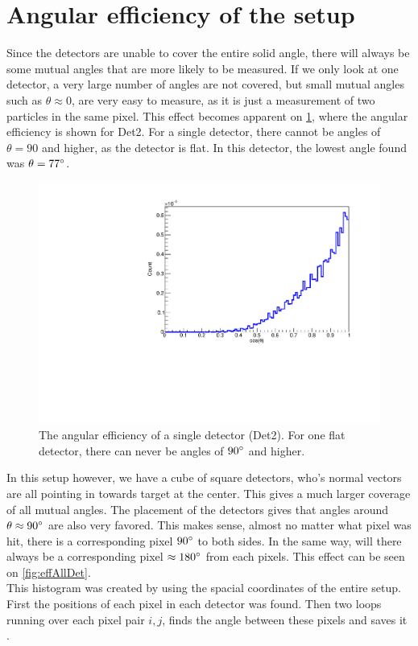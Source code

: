 \section{Angular efficiency of the setup}
Since the detectors are unable to cover the entire solid angle, there will always be some mutual angles that are more likely to be measured. 
If we only look at one detector, a very large number of angles are not covered, but small mutual angles such as $\theta \approx 0$, are very easy to measure, as it is just a measurement of two particles in the same pixel. 
This effect becomes apparent on \cref{fig:oneDetEff}, where the angular efficiency is shown for Det2. For a single detector, there cannot be angles of $\theta = 90$ and higher, as the detector is flat. In this detector, the lowest angle found was $\theta = 77\degree$.\\

\begin{figure}[h]
	\includegraphics[width=\linewidth]{../figures/det2Eff.pdf}
	\caption{The angular efficiency of a single detector (Det2). For one flat detector, there can never be angles of $90\degree$ and higher.}
	\label{fig:oneDetEff}
\end{figure}
In this setup however, we have a cube of square detectors, who's normal vectors are all pointing in towards target at the center. This gives a much larger coverage of all mutual angles. 
The placement of the detectors gives that angles around $\theta \approx 90 \degree$ are also very favored. This makes sense, almost no matter what pixel was hit, there is a corresponding pixel $90\degree$ to both sides. In the same way, will there always be a corresponding pixel $\approx 180\degree$ from each pixels. This effect can be seen on \cref{fig:effAllDet}. \\
This histogram was created by using the spacial coordinates of the entire setup. First the positions of each pixel in each detector was found. Then two loops running over each pixel pair $i, j$, finds the angle between these pixels and saves it .\\

